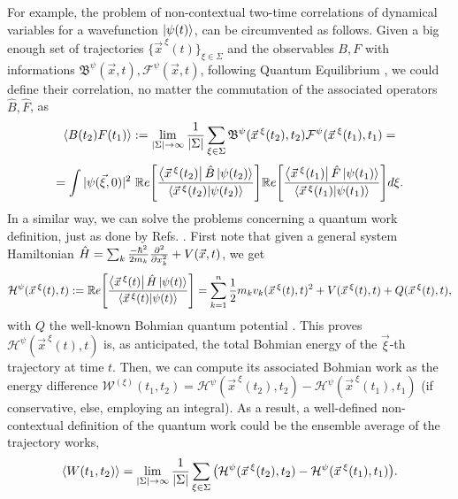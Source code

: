 \documentclass[11pt, a4paper]{article} %
\newcommand{\B}{\mathfrak{B}}
\begin{document}
For example, the problem of non-contextual two-time correlations of dynamical variables for a wavefunction $\ket{\psi(t)}$, can be circumvented as follows. Given a big enough set of trajectories $\{\vec{x}^{\:\xi}(t)\}_{\xi\in \Sigma}$ and the observables $B,F$ with informations $\B^\psi(\vec{x},t),\mathcal{F}^\psi(\vec{x},t)$, following Quantum Equilibrium \cite{Absolute}, we could define their correlation, no matter the commutation of the associated operators $\hat{B},\hat{F}$, as\vspace{-0.12cm}
\begin{equation}
\langle B(t_2)F(t_1)\rangle := \lim_{|\Sigma|\rightarrow \infty}\frac{1}{|\Sigma|} \sum_{\xi\in\Sigma} \B^\psi(\vec{x}^{\:\xi}(t_2),t_2)\mathcal{F}^\psi(\vec{x}^{\:\xi}(t_1),t_1) =\vspace{-0.12cm}
\end{equation}
$$
=  \int |\psi(\vec{\xi},0)|^2\ \mathbb{R}e\qty[ \frac{\bra{\vec{x}^{\:\xi}(t_2)}\hat{B}\ket{\psi(t_2)}}{\bra{\vec{x}^{\:\xi}(t_2)}\ket{\psi(t_2)}} ] \mathbb{R}e\qty[ \frac{\bra{\vec{x}^{\:\xi}(t_1)}\hat{F}\ket{\psi(t_1)}}{\bra{\vec{x}^{\:\xi}(t_1)}\ket{\psi(t_1)}} ]d\xi.
$$
 In a similar way, we can solve the problems concerning a quantum work definition, just as done by Refs. \cite{work1, work2}. First note that given a general system Hamiltonian $\hat{H}=\sum_k \frac{-\hbar^2}{2m_k}\pdv[2]{}{x_k}+V(\vec{x},t)$, we get\vspace{-0.15cm}
\begin{equation}
\mathcal{H}^\psi(\vec{x}^{\:\xi}(t),t) := \mathbb{R}e\qty[ \frac{\bra{\vec{x}^{\:\xi}(t)}\hat{H}\ket{\psi(t)}}{\bra{\vec{x}^{\:\xi}(t)}\ket{\psi(t)}} ] = \sum_{k=1}^n\frac{1}{2}m_kv_k(\vec{x}^{\:\xi}(t),t)^2+V(\vec{x}^{\:\xi}(t),t)+Q(\vec{x}^{\:\xi}(t),t),\vspace{-0.15cm}
\end{equation}
with $Q$ the well-known Bohmian quantum potential \cite{Holland, Durr, JordiXavier}. This proves $\mathcal{H}^\psi(\vec{x}^{\:\xi}(t),t)$ is, as anticipated, the total Bohmian energy of the $\vec{\xi}$-th trajectory at time $t$. Then, we can compute its associated Bohmian work as the energy difference $\mathcal{W}^{(\xi)}(t_1,t_2)= \mathcal{H}^\psi(\vec{x}^{\:\xi}(t_2),t_2)-\mathcal{H}^\psi(\vec{x}^{\:\xi}(t_1),t_1)$ (if conservative, else, employing an integral). As a result, a well-defined non-contextual definition of the quantum work could be the ensemble average of the trajectory works,\vspace{-0.1cm}
\begin{equation}
\langle W(t_1,t_2)\rangle = \lim_{|\Sigma|\rightarrow \infty}\frac{1}{|\Sigma|} \sum_{\xi\in\Sigma} \qty(\mathcal{H}^\psi(\vec{x}^{\:\xi}(t_2),t_2)-\mathcal{H}^\psi(\vec{x}^{\:\xi}(t_1),t_1)).\vspace{-0.1cm}
\end{equation}
\end{document}
